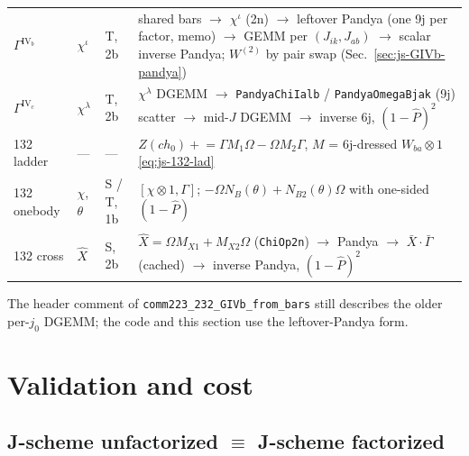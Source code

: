 \documentclass[enabledeprecatedfontcommands]{scrartcl}
\newcommand{\codename}[1]{\texttt{#1}}
\begin{document}
\begin{center}
\begin{tabular}{@{}lllp{}@{}}
$\Gamma^{\mathrm{IV}_b}$ & $\chi^\iota$ & T, 2b &
  shared bars $\to$ $\chi^\iota$ (2n) $\to$ leftover Pandya
  (one 9j per factor, memo) $\to$ GEMM per $(J_{ik},J_{ab})$ $\to$
  scalar inverse Pandya; $W^{(2)}$ by pair swap
  (Sec.~\ref{sec:js-GIVb-pandya}) \\
$\Gamma^{\mathrm{IV}_c}$ & $\chi^\lambda$ & T, 2b &
  $\chi^\lambda$ DGEMM $\to$ \codename{PandyaChiIalb} /
  \codename{PandyaOmegaBjak} (9j) scatter $\to$ mid-$J$ DGEMM $\to$
  inverse 6j, $(1-\hat P)^2$ \\
132 ladder & --- & --- &
  $Z(ch_0)\mathrel{+}=\Gamma M_1\Omega-\Omega M_2\Gamma$, $M$ = 6j-dressed
  $W_{ba}\otimes1$ \eqref{eq:js-132-lad} \\
132 onebody & $\chi$, $\theta$ & S / T, 1b &
  $[\chi\otimes1,\Gamma]$; $-\Omega N_B(\theta)+N_{B2}(\theta)\Omega$ with
  one-sided $(1-\hat P)$ \\
132 cross & $\hat X$ & S, 2b &
  $\hat X=\Omega M_{X1}+M_{X2}\Omega$ (\codename{ChiOp2n}) $\to$ Pandya
  $\to$ $\bar X\cdot\bar\Gamma$ (cached) $\to$ inverse Pandya,
  $(1-\hat P)^2$ \\
\hline
\end{tabular}
\end{center}

The header comment of \codename{comm223\_232\_GIVb\_from\_bars} still
describes the older per-$j_0$ DGEMM; the code and this section use the
leftover-Pandya form.

\section{Validation and cost}
\label{sec:cost}

\subsection{J-scheme unfactorized $\equiv$ J-scheme factorized}
\end{document}
